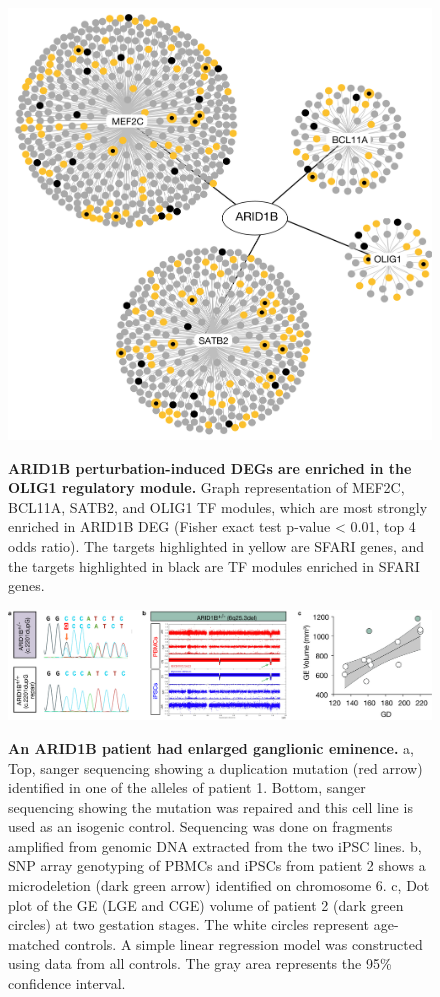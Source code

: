 \begin{figure}[h!]
    \centering
	\includegraphics[width=\textwidth]{figures/asd/Figure_S9}
    \label{fig:asdS9}
    \caption{\textbf{ARID1B perturbation-induced DEGs are enriched in the OLIG1 regulatory module.}  
    Graph representation of MEF2C, BCL11A, SATB2, and OLIG1 TF modules, which are most strongly enriched in ARID1B DEG (Fisher exact test p-value < 0.01, top 4 odds ratio). The targets highlighted in yellow are SFARI genes, and the targets highlighted in black are TF modules enriched in SFARI genes. }
\end{figure}



\begin{figure}[h!]
    \centering
	\includegraphics[width=\textwidth]{figures/asd/Figure_S10}
    \label{fig:asdS10}
    \caption{\textbf{An ARID1B patient had enlarged ganglionic eminence.}  
    a, Top, sanger sequencing showing a duplication mutation (red arrow) identified in one of the alleles of patient 1. Bottom, sanger sequencing showing the mutation was repaired and this cell line is used as an isogenic control. Sequencing was done on fragments amplified from genomic DNA extracted from the two iPSC lines.  b, SNP array genotyping of PBMCs and iPSCs from patient 2 shows a microdeletion (dark green arrow) identified on chromosome 6. c, Dot plot of the GE (LGE and CGE) volume of patient 2 (dark green circles) at two gestation stages. The white circles represent age-matched controls. A simple linear regression model was constructed using data from all controls. The gray area represents the 95\% confidence interval.}
\end{figure}


